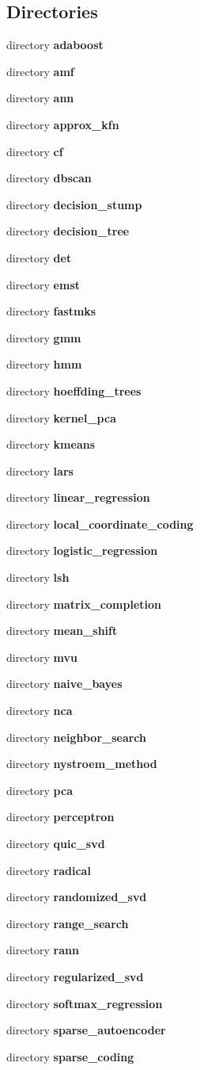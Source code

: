 \subsection*{Directories}
\begin{DoxyCompactItemize}
\item 
directory {\bf adaboost}
\item 
directory {\bf amf}
\item 
directory {\bf ann}
\item 
directory {\bf approx\+\_\+kfn}
\item 
directory {\bf cf}
\item 
directory {\bf dbscan}
\item 
directory {\bf decision\+\_\+stump}
\item 
directory {\bf decision\+\_\+tree}
\item 
directory {\bf det}
\item 
directory {\bf emst}
\item 
directory {\bf fastmks}
\item 
directory {\bf gmm}
\item 
directory {\bf hmm}
\item 
directory {\bf hoeffding\+\_\+trees}
\item 
directory {\bf kernel\+\_\+pca}
\item 
directory {\bf kmeans}
\item 
directory {\bf lars}
\item 
directory {\bf linear\+\_\+regression}
\item 
directory {\bf local\+\_\+coordinate\+\_\+coding}
\item 
directory {\bf logistic\+\_\+regression}
\item 
directory {\bf lsh}
\item 
directory {\bf matrix\+\_\+completion}
\item 
directory {\bf mean\+\_\+shift}
\item 
directory {\bf mvu}
\item 
directory {\bf naive\+\_\+bayes}
\item 
directory {\bf nca}
\item 
directory {\bf neighbor\+\_\+search}
\item 
directory {\bf nystroem\+\_\+method}
\item 
directory {\bf pca}
\item 
directory {\bf perceptron}
\item 
directory {\bf quic\+\_\+svd}
\item 
directory {\bf radical}
\item 
directory {\bf randomized\+\_\+svd}
\item 
directory {\bf range\+\_\+search}
\item 
directory {\bf rann}
\item 
directory {\bf regularized\+\_\+svd}
\item 
directory {\bf softmax\+\_\+regression}
\item 
directory {\bf sparse\+\_\+autoencoder}
\item 
directory {\bf sparse\+\_\+coding}
\end{DoxyCompactItemize}
